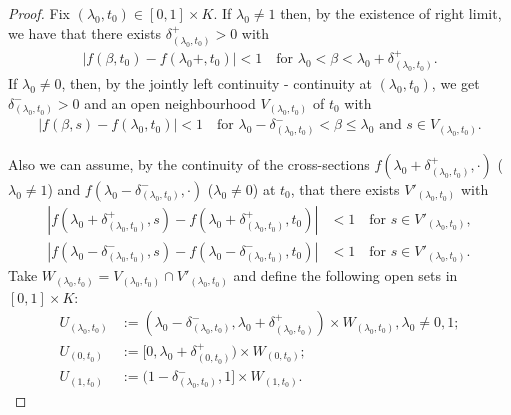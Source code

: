 \documentclass[10pt,a4paper]{amsart}
\begin{document}
\begin{proof}
Fix $(\lambda_0,t_0)\in [0,1]\times K$. If $\lambda_0\neq 1$ then, by the existence of right limit, we have that there exists
$\delta_{(\lambda_0,t_0)}^+ >0$ with
\begin{align}\label{eqRL1}
|f(\beta,t_0)-f(\lambda_0+,t_0)|<1 \quad \text{for $\lambda_0<\beta<\lambda_0 +\delta_{(\lambda_0,t_0)}^+$}.
\end{align}
If $\lambda_0\neq 0$, then, by the jointly left continuity - continuity at $(\lambda_0, t_0)$, we get $\delta_{(\lambda_0,t_0)}^->0$ and an open neighbourhood $V_{(\lambda_0,t_0)}$ of $t_0$
with
\begin{align}\label{eqRL2}
|f(\beta,s)-f(\lambda_0,t_0)|<1 \quad \text{for $\lambda_0-\delta_{(\lambda_0,t_0)}^-<\beta\leq \lambda_0$ and $s\in V_{(\lambda_0,t_0)}$.}
\end{align}

Also we can assume, by the continuity of the cross-sections $f(\lambda_0 +\delta_{(\lambda_0,t_0)}^+,\cdot)$ ($\lambda_0\neq 1$) and
$f(\lambda_0 -\delta_{(\lambda_0,t_0)}^-,\cdot)$ ($\lambda_0\neq  0$) at $t_0$, that there exists $V'_{(\lambda_0,t_0)}$ with
\begin{align}\label{eqRL3}
|f(\lambda_0 +\delta_{(\lambda_0,t_0)}^+,s)-f(\lambda_0 +\delta_{(\lambda_0,t_0)}^+,t_0)|&<1 \quad \text{for $s\in V'_{(\lambda_0,t_0)}$},\\
\label{eqRL4}
|f(\lambda_0 -\delta_{(\lambda_0,t_0)}^-,s)-f(\lambda_0 -\delta_{(\lambda_0,t_0)}^-,t_0)|&<1 \quad \text{for $s\in V'_{(\lambda_0,t_0)}$}.
\end{align}
Take $W_{(\lambda_0,t_0)}=V_{(\lambda_0,t_0)}\cap V'_{(\lambda_0,t_0)}$ and  define the following open sets in $[0,1]\times K$:
\begin{align*}
U_{(\lambda_0,t_0)}&:=(\lambda_0 -\delta_{(\lambda_0,t_0)}^-,\lambda_0 +\delta_{(\lambda_0,t_0)}^+)\times W_{(\lambda_0,t_0)}, \lambda_0\neq 0,1;\\
U_{(0,t_0)}&:=[0,\lambda_0 +\delta_{(0,t_0)}^+)\times W_{(0,t_0)};\\
U_{(1,t_0)}&:=(1 -\delta_{(\lambda_0,t_0)}^-,1]\times W_{(1,t_0)}.
\end{align*}


\end{proof}
\end{document}
